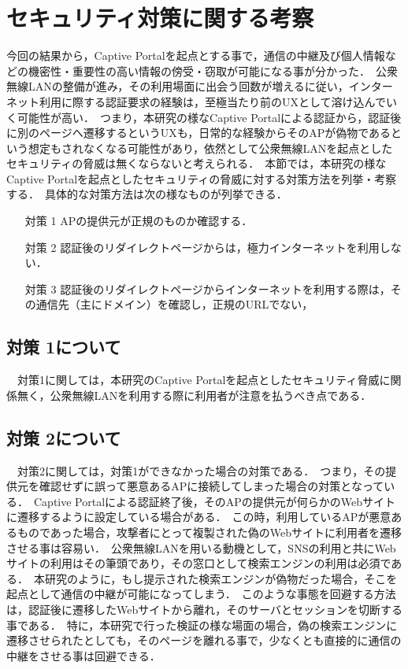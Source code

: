 \documentclass[dvipdfmx]{jsarticle}
\begin{document}
        \section{セキュリティ対策に関する考察}
            今回の結果から，Captive Portalを起点とする事で，通信の中継及び個人情報などの機密性・重要性の高い情報の傍受・窃取が可能になる事が分かった．\
            公衆無線LANの整備が進み，その利用場面に出会う回数が増えるに従い，インターネット利用に際する認証要求の経験は，至極当たり前のUXとして溶け込んでいく可能性が高い．\
            つまり，本研究の様なCaptive Portalによる認証から，認証後に別のページへ遷移するというUXも，日常的な経験からそのAPが偽物であるという想定もされなくなる可能性があり，依然として公衆無線LANを起点としたセキュリティの脅威は無くならないと考えられる．\
            本節では，本研究の様なCaptive Portalを起点としたセキュリティの脅威に対する対策方法を列挙・考察する．\
            具体的な対策方法は次の様なものが列挙できる．\
            \begin{enumerate}
                \item[対策 1] APの提供元が正規のものか確認する．
                \item[対策 2] 認証後のリダイレクトページからは，極力インターネットを利用しない．
                \item[対策 3] 認証後のリダイレクトページからインターネットを利用する際は，その通信先（主にドメイン）を確認し，正規のURLでない，
            \end{enumerate}
            \subsection{対策 1について}
                　対策1に関しては，本研究のCaptive Portalを起点としたセキュリティ脅威に関係無く，公衆無線LANを利用する際に利用者が注意を払うべき点である．\
            \subsection{対策 2について}
                　対策2に関しては，対策1ができなかった場合の対策である．\
                つまり，その提供元を確認せずに誤って悪意あるAPに接続してしまった場合の対策となっている．\
                Captive Portalによる認証終了後，そのAPの提供元が何らかのWebサイトに遷移するように設定している場合がある．\
                この時，利用しているAPが悪意あるものであった場合，攻撃者にとって複製された偽のWebサイトに利用者を遷移させる事は容易い．\
                公衆無線LANを用いる動機として，SNSの利用と共にWebサイトの利用はその筆頭であり，その窓口として検索エンジンの利用は必須である．\
                本研究のように，もし提示された検索エンジンが偽物だった場合，そこを起点として通信の中継が可能になってしまう．\
                このような事態を回避する方法は，認証後に遷移したWebサイトから離れ，そのサーバとセッションを切断する事である．\
                特に，本研究で行った検証の様な場面の場合，偽の検索エンジンに遷移させられたとしても，そのページを離れる事で，少なくとも直接的に通信の中継をさせる事は回避できる．\
\end{document}
